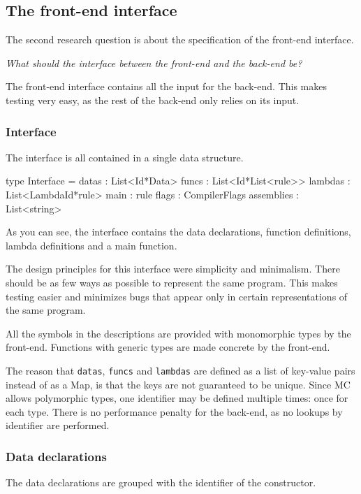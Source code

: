 \subsection{The front-end interface}
The second research question is about the specification of the front-end interface.

\textit{What should the interface between the front-end and the back-end be?}

The front-end interface contains all the input for the back-end.
This makes testing very easy, as the rest of the back-end only relies on its input.

\subsubsection{Interface}
The interface is all contained in a single data structure.

\begin{FS}
type Interface = {
  datas      : List<Id*Data>
  funcs      : List<Id*List<rule>>
  lambdas    : List<LambdaId*rule>
  main       : rule
  flags      : CompilerFlags
  assemblies : List<string> 
}
\end{FS}

As you can see, the interface contains the data declarations, function definitions, lambda definitions and a main function.

The design principles for this interface were simplicity and minimalism.
There should be as few ways as possible to represent the same program.
This makes testing easier and minimizes bugs that appear only in certain representations of the same program.

All the symbols in the descriptions are provided with monomorphic types by the front-end.
Functions with generic types are made concrete by the front-end.

The reason that \texttt{datas}, \texttt{funcs} and \texttt{lambdas} are defined as a list of key-value pairs instead of as a Map, is that the keys are not guaranteed to be unique.
Since MC allows polymorphic types, one identifier may be defined multiple times: once for each type.
There is no performance penalty for the back-end, as no lookups by identifier are performed.

\subsubsection{Data declarations}
The data declarations are grouped with the identifier of the constructor.

